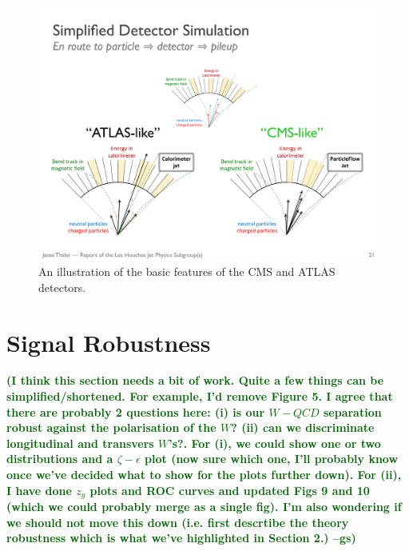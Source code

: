 \documentclass[11pt,letterpaper]{article}
\newcommand{\gs}[1]{\textbf{\textcolor{darkgreen}{(#1 --gs)}}}
\begin{document}
\begin{figure}
\begin{center}
\includegraphics[width=1.0\columnwidth]{figures/CMS_vs_ATLAS_detector}
\end{center}
\caption{An illustration of the basic features of the CMS and ATLAS detectors.}
\end{figure}




\section{Signal Robustness}\label{sec:polar}

\gs{I think this section needs a bit of work. Quite a few things can
  be simplified/shortened. For example, I'd remove Figure 5. I agree
  that there are probably 2 questions here: (i) is our $W-QCD$
  separation robust against the polarisation of the $W$? (ii) can we
  discriminate longitudinal and transvers $W$'s?. For (i), we could
  show one or two distributions and a $\zeta-\epsilon$ plot (now sure
  which one, I'll probably know once we've decided what to show for
  the plots further down). For (ii), I have done $z_g$ plots and ROC
  curves and updated Figs 9 and 10 (which we could probably merge as a
  single fig). I'm also wondering if we should not move this down
  (i.e. first descrtibe the theory robustness which is what we've
  highlighted in Section 2.)}
\end{document}
